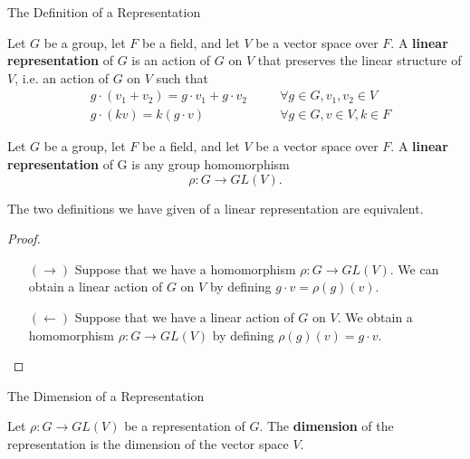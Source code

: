 \begin{frame}{The Definition of a Representation}
\begin{definition}\label{rep-def-2}Let $G$ be a group, let $F$ be a field, and let $V$ be a vector space over $F$. A \textbf{linear representation} of $G$ is an action of $G$ on $V$ that preserves the linear structure of $V$, i.e. an action of $G$ on $V$ such that
\begin{align}
\label{rep-axiom-1}&g \cdot (v_1+v_2)=g \cdot v_1+g \cdot v_2 \quad && \forall g \in G, v_1, v_2 \in V \\
\label{rep-axiom-2}&g \cdot (kv) = k (g \cdot v) \quad && \forall g \in G, v \in V, k \in F
\end{align}
\end{definition}
\begin{definition}
Let $G$ be a group, let $F$ be a field, and let $V$ be a vector space over $F$.  A \textbf{linear representation} of G is any group homomorphism \[\rho\colon G \to GL(V).\]\end{definition}
\end{frame}


\begin{frame}
\begin{proposition}
The two definitions we have given of a linear representation are equivalent.
 \end{proposition}
 \begin{proof}
\begin{itemize}
\item[$(\rightarrow)$]  Suppose that we have a homomorphism $\rho \colon G \to GL(V)$.  We can obtain a linear action of $G$ on $V$ by defining $g \cdot v = \rho(g)(v)$. 

\item[$(\leftarrow)$] Suppose that we have a linear action of $G$ on $V$.  We obtain a homomorphism $\rho \colon G \to GL(V)$ by defining $\rho(g)(v) =g \cdot v$. 
\end{itemize}
 \end{proof}
\end{frame}

\begin{frame}{The Dimension of a Representation}
 \begin{definition}Let $\rho \colon G \to GL(V)$ be a representation of $G$.  The \textbf{dimension} of the representation is the dimension of the vector space $V$.  
 \end{definition}
\end{frame}

